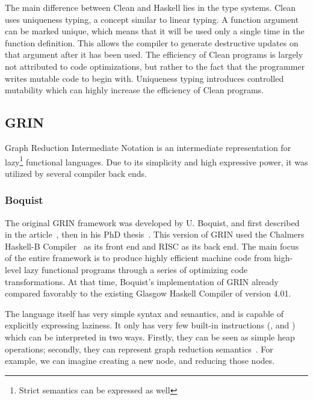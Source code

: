 \documentclass[main.tex]{subfiles}
\begin{document}
	The main difference between Clean and Haskell lies in the type systems. Clean uses uniqueness typing, a concept similar to linear typing. A function argument can be marked unique, which means that it will be used only a single time in the function definition. This allows the compiler to generate destructive updates on that argument after it has been used. The efficiency of Clean programs is largely not attributed to code optimizations, but rather to the fact that the programmer writes mutable code to begin with. Uniqueness typing introduces controlled mutability which can highly increase the efficiency of Clean programs.
	
	
	\subsection{GRIN}
	
	Graph Reduction Intermediate Notation is an intermediate representation for lazy\footnote{Strict semantics can be expressed as well} functional languages. Due to its simplicity and high expressive power, it was utilized by several compiler back ends.
	
	\subsubsection{Boquist}
	
	The original GRIN framework was developed by U. Boquist, and first described in the article~\cite{boquist-grin}, then in his PhD thesis~\cite{boquist-phd}. This version of GRIN used the Chalmers Haskell-B Compiler~\cite{hbc} as its front end and RISC as its back end. The main focus of the entire framework is to produce highly efficient machine code from high-level lazy functional programs through a series of optimizing code transformations. At that time, Boquist's implementation of GRIN already compared favorably to the existing Glasgow Haskell Compiler of version 4.01.
	
	The language itself has very simple syntax and semantics, and is capable of explicitly expressing laziness. It only has very few built-in instructions (,  and ) which can be interpreted in two ways. Firstly, they can be seen as simple heap operations; secondly, they can represent graph reduction semantics~\cite{impl-fun-lang}. For example, we can imagine  creating a new node, and  reducing those nodes.
	
\end{document}
